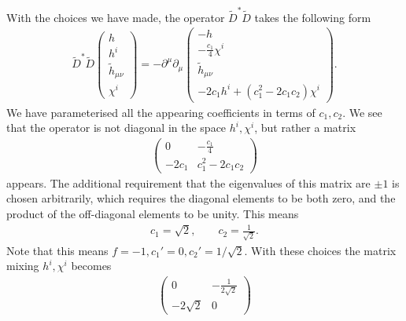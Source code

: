 \documentclass[10pt]{report}
\theoremstyle{definition}
\begin{document}
With the choices we have made, the operator $\tilde{D}^* \tilde{D}$ takes the following form
\begin{align}
\tilde{D}^* \tilde{D} \left( \begin{array}{c} h \\ h^i \\ \tilde{h}_{\mu\nu} \\ \chi^i \end{array}\right) = - \partial^\mu \partial_\mu \left( \begin{array}{c} - h \\ - \frac{c_1}{4} \chi^i \\ \tilde{h}_{\mu\nu} \\ -2c_1 h^i + (c_1^2-2c_1 c_2)\chi^i\end{array}\right).
\end{align}
We have parameterised all the appearing coefficients in terms of $c_1, c_2$. We see that the operator is not diagonal in the space $h^i,\chi^i$, but rather a matrix
\begin{align}
\left( \begin{array}{cc} 0 & - \frac{c_1}{4} \\ -2c_1 & c_1^2-2c_1 c_2 \end{array}\right)
\end{align}
appears. The additional requirement that the eigenvalues of this matrix are $\pm 1$ is chosen arbitrarily, which requires the diagonal elements to be both zero, and the product of the off-diagonal elements to be unity. This means
\begin{align}
c_1= \sqrt{2}, \qquad c_2 = \frac{1}{\sqrt{2}}.
\end{align}
Note that this means $f=-1, c_1'= 0, c_2'= 1/\sqrt{2}$. With these choices the matrix mixing $h^i, \chi^i$ becomes
\begin{align}
\left( \begin{array}{cc} 0 & - \frac{1}{2\sqrt{2}} \\ -2\sqrt{2} & 0 \end{array}\right)
\end{align}
\end{document}
